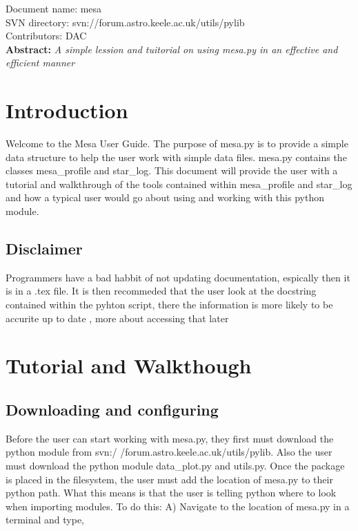 \renewcommand{\ndoctitle}{mesa.py: Mesa Data Structure} 
\renewcommand{\ndocname}{mesa}                      
\renewcommand{\svndir}{svn://forum.astro.keele.ac.uk/utils/pylib}  
\renewcommand{\ndoccontribs}{DAC}



Document name: \ndocname \\
SVN directory: \svndir\\
Contributors: \ndoccontribs\\



{  \textbf{Abstract:} \slshape
A simple lession and tuitorial on using mesa.py in an effective and efficient manner
}

\section{Introduction}
Welcome to the Mesa User Guide.  The purpose of mesa.py is
to provide a simple data structure to help the user work with simple data files. 
mesa.py contains the classes mesa\_profile and star\_log.
This document will provide the user with a 
tutorial and walkthrough of the tools contained within mesa\_profile and star\_log and
how a typical user would go about using and working with this python module.
\subsection{Disclaimer}
Programmers have a bad habbit of not updating documentation, espically then it is in  a .tex file.
It is then recommeded that the user look at the docstring contained within the pyhton script, there the information is more likely to be accurite up to date
, more about accessing that later
\section{Tutorial and Walkthough}

\subsection{Downloading and configuring}
Before the user can start working with mesa.py, they first must download the python 
module from svn:/ /forum.astro.keele.ac.uk/utils/pylib.  Also the user must download the python module data\_plot.py and utils.py. Once the package is placed in the filesystem, the user must add the location
of mesa.py to their python path.  What this means is that the user is telling python where to look when importing modules.
To do this:
\newline
A) Navigate to the location of mesa.py in a terminal and type,

